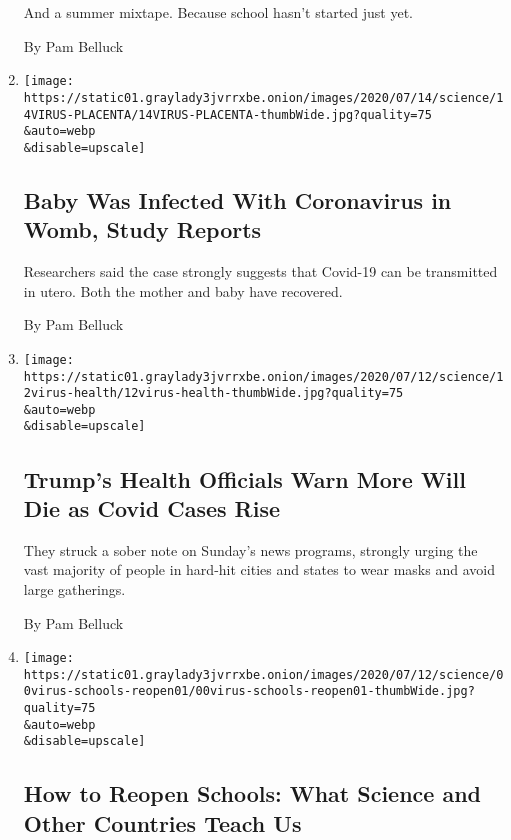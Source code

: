 \begin{enumerate}
  And a summer mixtape. Because school hasn't started just yet.

  By Pam Belluck
\item
  \href{/2020/07/14/health/coronavirus-pregnancy-covid-19.html}{}

  \texttt{[image: https://static01.graylady3jvrrxbe.onion/images/2020/07/14/science/14VIRUS-PLACENTA/14VIRUS-PLACENTA-thumbWide.jpg?quality=75\\\&auto=webp\\\&disable=upscale]}

  \hypertarget{baby-was-infected-with-coronavirus-in-womb-study-reports}{%
  \subsection{Baby Was Infected With Coronavirus in Womb, Study
  Reports}\label{baby-was-infected-with-coronavirus-in-womb-study-reports}}

  Researchers said the case strongly suggests that Covid-19 can be
  transmitted in utero. Both the mother and baby have recovered.

  By Pam Belluck
\item
  \href{/2020/07/12/health/coronavirus-trump-deaths.html}{}

  \texttt{[image: https://static01.graylady3jvrrxbe.onion/images/2020/07/12/science/12virus-health/12virus-health-thumbWide.jpg?quality=75\\\&auto=webp\\\&disable=upscale]}

  \hypertarget{trumps-health-officials-warn-more-will-die-as-covid-cases-rise}{%
  \subsection{Trump's Health Officials Warn More Will Die as Covid Cases
  Rise}\label{trumps-health-officials-warn-more-will-die-as-covid-cases-rise}}

  They struck a sober note on Sunday's news programs, strongly urging
  the vast majority of people in hard-hit cities and states to wear
  masks and avoid large gatherings.

  By Pam Belluck
\item
  \href{/2020/07/11/health/coronavirus-schools-reopen.html}{}

  \texttt{[image: https://static01.graylady3jvrrxbe.onion/images/2020/07/12/science/00virus-schools-reopen01/00virus-schools-reopen01-thumbWide.jpg?quality=75\\\&auto=webp\\\&disable=upscale]}

  \hypertarget{how-to-reopen-schools-what-science-and-other-countries-teach-us}{%
  \subsection{How to Reopen Schools: What Science and Other Countries
  Teach
  Us}\label{how-to-reopen-schools-what-science-and-other-countries-teach-us}}


\end{enumerate}
